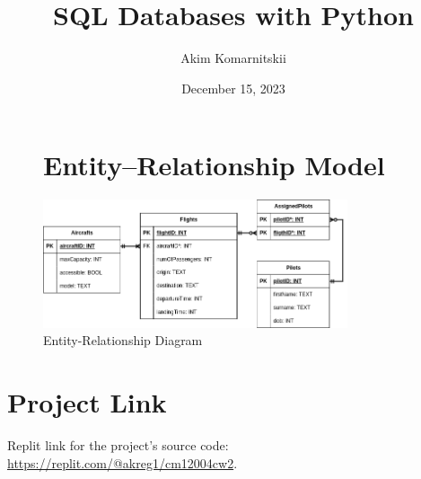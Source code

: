 \documentclass[12pt]{article}
\begin{document}
\title{SQL Databases with Python}
\author{Akim Komarnitskii}
\date{December 15, 2023}
\maketitle
\thispagestyle{fancy}

\begin{figure}[ht]
\section*{Entity–Relationship Model}
\centering
\includegraphics[width=0.8\textwidth]{ERD.png}
\caption{Entity-Relationship Diagram}
\label{fig:erd}
\end{figure}

\section*{Project Link}
Replit link for the project's source code: \url{https://replit.com/@akreg1/cm12004cw2}.
\end{document}
